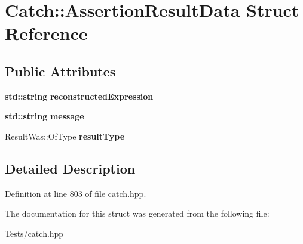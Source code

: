 \hypertarget{struct_catch_1_1_assertion_result_data}{}\section{Catch\+:\+:Assertion\+Result\+Data Struct Reference}
\label{struct_catch_1_1_assertion_result_data}
\subsection*{Public Attributes}
\begin{DoxyCompactItemize}
\item 
\mbox{\label{struct_catch_1_1_assertion_result_data_a9e809d36fffbeb1c7d0cbe7382dd9595}} 
\textbf{ std\+::string} {\bfseries reconstructed\+Expression}
\item 
\mbox{\label{struct_catch_1_1_assertion_result_data_ac34215803c4c4a88f795879f61c1f7b4}} 
\textbf{ std\+::string} {\bfseries message}
\item 
\mbox{\label{struct_catch_1_1_assertion_result_data_a7ceab4a7ff722aec5587e3748caf66b7}} 
Result\+Was\+::\+Of\+Type {\bfseries result\+Type}
\end{DoxyCompactItemize}


\subsection{Detailed Description}


Definition at line 803 of file catch.\+hpp.



The documentation for this struct was generated from the following file\+:\begin{DoxyCompactItemize}
\item 
Tests/catch.\+hpp\end{DoxyCompactItemize}
